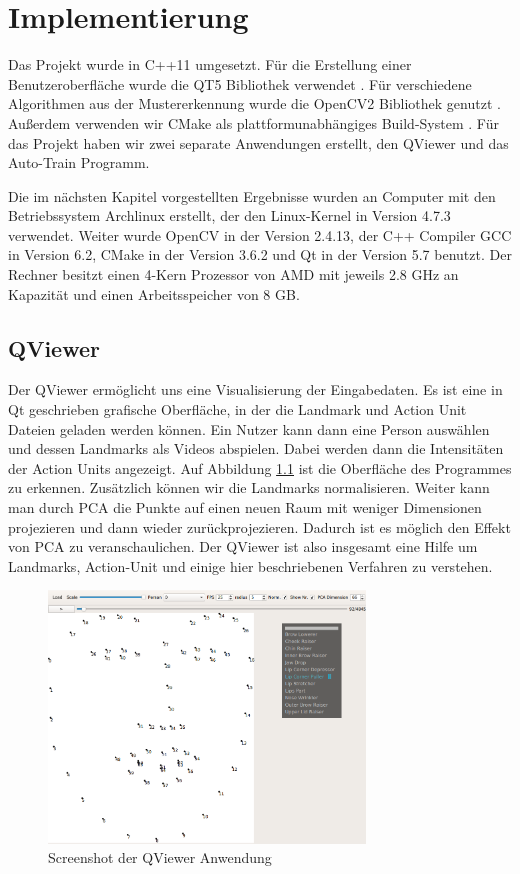 \chapter{Implementierung}\label{ch:implementierung}
Das Projekt wurde in C++11 umgesetzt. Für die Erstellung einer Benutzeroberfläche wurde die QT5 Bibliothek verwendet \cite{qt5}.
Für verschiedene Algorithmen aus der Mustererkennung wurde die OpenCV2 Bibliothek genutzt \cite{opencv}. Außerdem verwenden wir CMake
als plattformunabhängiges Build-System \cite{cmake}. Für das Projekt haben wir zwei separate Anwendungen erstellt, den QViewer und das Auto-Train
Programm.

Die im nächsten Kapitel vorgestellten Ergebnisse wurden an Computer mit den Betriebssystem Archlinux erstellt, der den Linux-Kernel in Version 4.7.3 verwendet. Weiter wurde OpenCV in der Version 2.4.13, der C++ Compiler GCC in Version 6.2, CMake in der Version 3.6.2 und Qt in der Version 5.7 benutzt. Der Rechner besitzt einen 4-Kern Prozessor von AMD mit jeweils 2.8 GHz an Kapazität und einen Arbeitsspeicher von 8 GB. 
\section{QViewer}
Der QViewer ermöglicht uns eine Visualisierung der Eingabedaten.
Es ist eine in Qt geschrieben grafische Oberfläche, in der
die Landmark und Action Unit Dateien geladen werden können. 
Ein Nutzer kann dann eine Person auswählen und dessen Landmarks als Videos abspielen.
Dabei werden dann die Intensitäten der Action Units angezeigt. Auf Abbildung \ref{Implementierung.QViewer} ist die Oberfläche des Programmes zu erkennen.
Zusätzlich können wir die Landmarks normalisieren. Weiter kann man durch PCA die Punkte auf einen neuen Raum mit weniger Dimensionen projezieren und dann wieder zurückprojezieren. Dadurch ist es möglich den Effekt von PCA zu veranschaulichen.
Der QViewer ist also insgesamt eine Hilfe um Landmarks, Action-Unit und einige hier beschriebenen Verfahren zu verstehen.

\begin{figure}
\begin{center}
\includegraphics[width=0.75\textwidth]{qviewer.png}
\caption{Screenshot der QViewer Anwendung}
\end{center}
\label{Implementierung.QViewer}
\end{figure}


